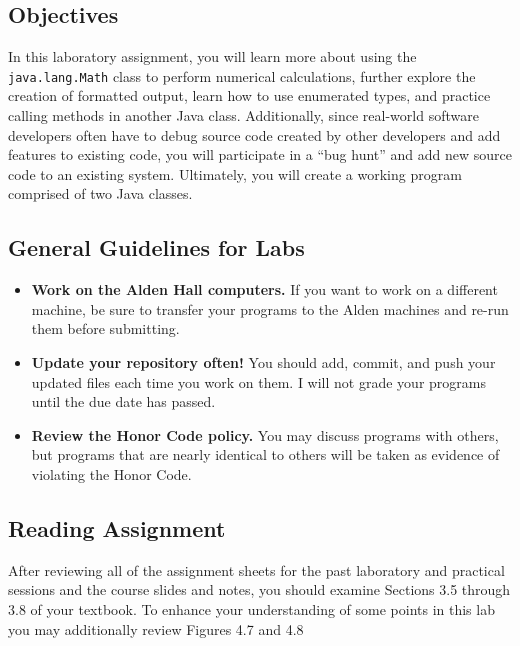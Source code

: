 


\subsection*{Objectives}

In this laboratory assignment, you will learn more about using the {\tt java.lang.Math} class to perform numerical
calculations, further explore the creation of formatted output, learn how to use enumerated types, and practice calling
methods in another Java class.  Additionally, since real-world software developers often have to debug source code
created by other developers and add features to existing code, you will participate in a ``bug hunt'' and add new
source code to an existing system. Ultimately, you will create a working program comprised of two Java classes.

\vspace*{-.1in}
\subsection*{General Guidelines for Labs}

\begin{itemize}
  \item
    {\bf Work on the Alden Hall computers.} If you want to work on a different
    machine, be sure to transfer your programs to the Alden
    machines and re-run them before submitting.
  \item
    {\bf Update your repository often!} You should add, commit,
    and push your updated files each time you work on them.  I will not grade
    your programs until the due date has passed.
  \item
    {\bf Review the Honor Code policy.} You
    may discuss programs with others, but programs that are nearly identical
    to others will be taken as evidence of violating the Honor Code.
\end{itemize}

\vspace*{-.2in}
\subsection*{Reading Assignment}

After reviewing all of the assignment sheets for the past laboratory and practical sessions and the course slides and
notes, you should examine Sections 3.5 through 3.8 of your textbook. To enhance your understanding of some points in
this lab you may additionally review Figures 4.7 and 4.8

